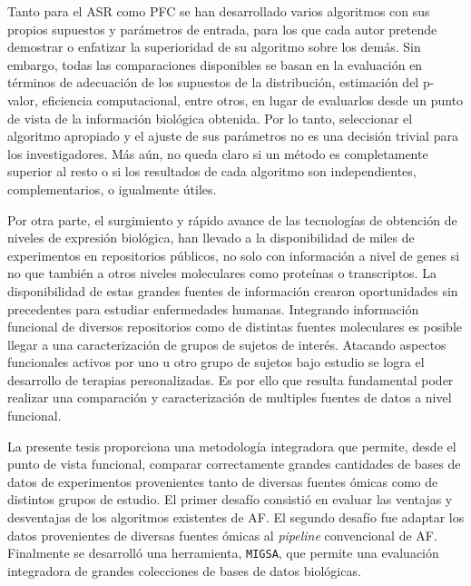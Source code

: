 \documentclass[12pt,twoside]{reedthesis}
\begin{document}
Tanto para el ASR como PFC se han desarrollado varios algoritmos con sus propios supuestos y parámetros de entrada, para los que cada autor pretende demostrar o enfatizar la superioridad de su algoritmo sobre los demás. Sin embargo, todas las comparaciones disponibles se basan en la evaluación en términos de adecuación de los supuestos de la distribución, estimación del p-valor, eficiencia computacional, entre otros, en lugar de evaluarlos desde un punto de vista de la información biológica obtenida. Por lo tanto, seleccionar el algoritmo apropiado y el ajuste de sus parámetros no es una decisión trivial para los investigadores. Más aún, no queda claro si un método es completamente superior al resto o si los resultados de cada algoritmo son independientes, complementarios, o igualmente útiles.

\par

Por otra parte, el surgimiento y rápido avance de las tecnologías de obtención de niveles de expresión biológica, han llevado a la disponibilidad de miles de experimentos en repositorios públicos, no solo con información a nivel de genes si no que también a otros niveles moleculares como proteínas o transcriptos. La disponibilidad de estas grandes fuentes de información crearon oportunidades sin precedentes para estudiar enfermedades humanas. Integrando información funcional de diversos repositorios como de distintas fuentes moleculares es posible llegar a una caracterización de grupos de sujetos de interés. Atacando aspectos funcionales activos por uno u otro grupo de sujetos bajo estudio se logra el desarrollo de terapias personalizadas. Es por ello que resulta fundamental poder realizar una comparación y caracterización de multiples fuentes de datos a nivel funcional.

\par

La presente tesis proporciona una metodología integradora que permite, desde el punto de vista funcional, comparar correctamente grandes cantidades de bases de datos de experimentos provenientes tanto de diversas fuentes ómicas como de distintos grupos de estudio. El primer desafío consistió en evaluar las ventajas y desventajas de los algoritmos existentes de AF. El segundo desafío fue adaptar los datos provenientes de diversas fuentes ómicas al \emph{pipeline} convencional de AF. Finalmente se desarrolló una herramienta, \texttt{MIGSA}, que permite una evaluación integradora de grandes colecciones de bases de datos biológicas.
\end{document}
